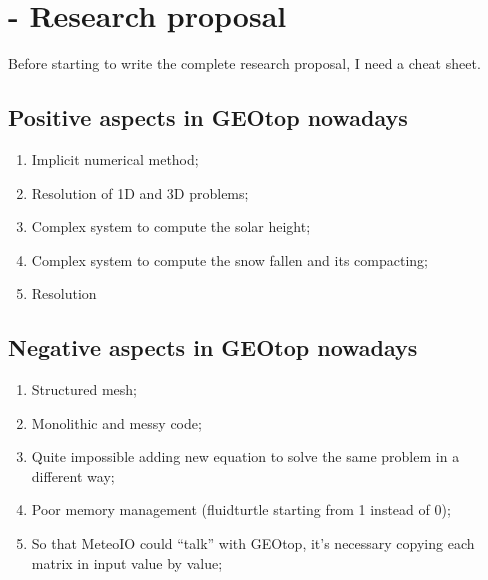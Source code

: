 \section{ - Research proposal}\label{sec:20150704}

Before starting to write the complete research proposal, I need a cheat sheet.

\subsection{Positive aspects in GEOtop nowadays}

\begin{enumerate}
\item Implicit numerical method;
\item Resolution of 1D and 3D problems;
\item Complex system to compute the solar height;
\item Complex system to compute the snow fallen and its compacting;
\item Resolution
\end{enumerate}

\subsection{Negative aspects in GEOtop nowadays}

\begin{enumerate}
\item Structured mesh;
\item Monolithic and messy code;
\item Quite impossible adding new equation to solve the same problem in a different way;
\item Poor memory management (fluidturtle starting from 1 instead of 0);
\item So that MeteoIO could ``talk'' with GEOtop, it's necessary copying each matrix in input value by value;
\end{enumerate}